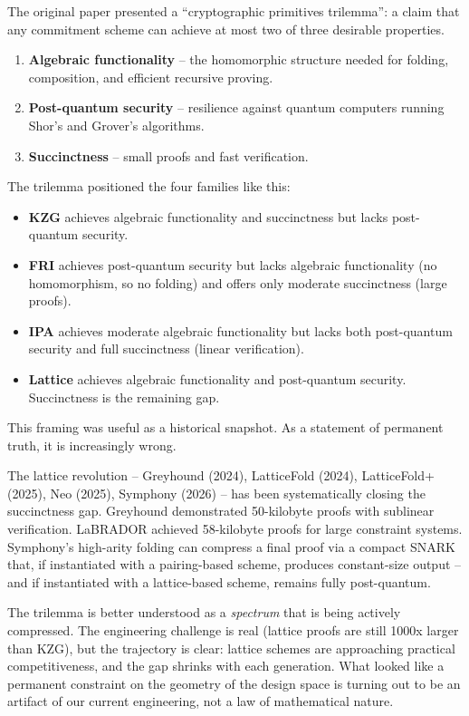 \documentclass[
  11pt,
  openany]{report}
\providecommand{\tightlist}{%
  \setlength{\itemsep}{0pt}\setlength{\parskip}{0pt}}
\renewcommand{\textbf}[1]{{\bfseries\color{MidnightBold}#1}}
\begin{document}
The original paper presented a ``cryptographic primitives trilemma'': a claim
that any commitment scheme can achieve at most two of three desirable
properties.

\begin{enumerate}
\def\labelenumi{\arabic{enumi}.}
\tightlist
\item
  \textbf{Algebraic functionality} -- the homomorphic structure needed for
  folding, composition, and efficient recursive proving.
\item
  \textbf{Post-quantum security} -- resilience against quantum computers running
  Shor's and Grover's algorithms.
\item
  \textbf{Succinctness} -- small proofs and fast verification.
\end{enumerate}

The trilemma positioned the four families like this:

\begin{itemize}
\tightlist
\item
  \textbf{KZG} achieves algebraic functionality and succinctness but lacks
  post-quantum security.
\item
  \textbf{FRI} achieves post-quantum security but lacks algebraic functionality
  (no homomorphism, so no folding) and offers only moderate succinctness (large
  proofs).
\item
  \textbf{IPA} achieves moderate algebraic functionality but lacks both
  post-quantum security and full succinctness (linear verification).
\item
  \textbf{Lattice} achieves algebraic functionality and post-quantum security.
  Succinctness is the remaining gap.
\end{itemize}

This framing was useful as a historical snapshot. As a statement of permanent
truth, it is increasingly wrong.

The lattice revolution -- Greyhound (2024), LatticeFold (2024), LatticeFold+
(2025), Neo (2025), Symphony (2026) -- has been systematically closing the
succinctness gap. Greyhound demonstrated 50-kilobyte proofs with sublinear
verification. LaBRADOR achieved 58-kilobyte proofs for large constraint systems.
Symphony's high-arity folding can compress a final proof via a compact SNARK
that, if instantiated with a pairing-based scheme, produces constant-size output
-- and if instantiated with a lattice-based scheme, remains fully post-quantum.

The trilemma is better understood as a \emph{spectrum} that is being actively
compressed. The engineering challenge is real (lattice proofs are still 1000x
larger than KZG), but the trajectory is clear: lattice schemes are approaching
practical competitiveness, and the gap shrinks with each generation. What looked
like a permanent constraint on the geometry of the design space is turning out
to be an artifact of our current engineering, not a law of mathematical nature.
\end{document}
